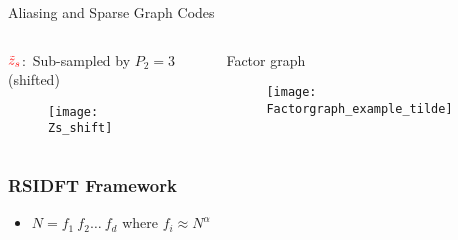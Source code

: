 \begin{frame}{Aliasing and Sparse Graph Codes}
{\begin{columns}
		\begin{block}{{\small$\color{red}\tilde{z}_s$:\ Sub-sampled by $P_2=3$ ({\color{blue}shifted})}}
			\begin{figure}[t]
				\centering
				\texttt{[image: Zs\_shift]}
			\end{figure}
		\end{block}
		
		\begin{block}{\small Factor graph}
			\begin{figure}[t]
				\centering
				\texttt{[image: Factorgraph\_example\_tilde]}
			\end{figure}
		\end{block}
	\end{columns}}
		
	\end{frame}

\begin{frame}\frametitle{RSIDFT Framework}
	\begin{itemize}
    \item $N = f_1 \ f_2 \ldots \ f_d$ where $f_i \approx N^\alpha$
    \end{itemize}
		\begin{figure}[t!]
			\begin{center}
				\resizebox{0.8\textwidth}{!}{}
			\end{center}	
			\label{fig:rsidft}
			\vspace{5 pt}
		\end{figure}
\end{frame}


